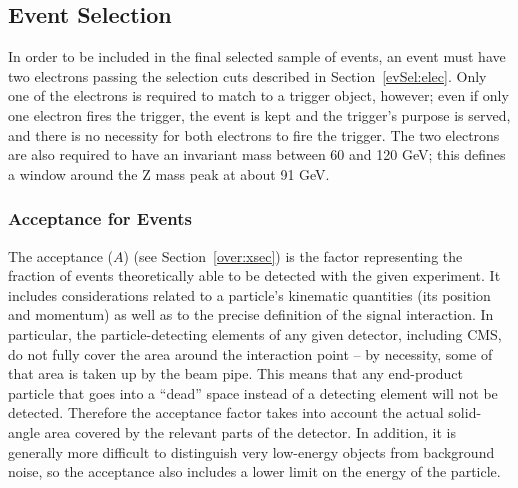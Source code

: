 \subsection{\Zee Event Selection}
\label{evSel:zee}

In order to be included in the final selected sample of \Zee events, 
an event must have two electrons passing the selection cuts 
described in Section~\ref{evSel:elec}.  
Only one of the electrons is required to match to a trigger object, however; 
even if only one electron fires the trigger, 
the event is kept and the trigger's purpose is served, 
and there is no 
necessity for both electrons to fire the trigger.  
The two electrons are also required to have an invariant mass 
between 60 and 120 GeV; 
this defines a window around the Z mass peak at about 91 GeV.  

\subsubsection{Acceptance for \Zee Events}  %
\label{evSel:acc}


The acceptance %
($A$) %
(see Section~\ref{over:xsec}) 
is the factor representing the fraction of events 
theoretically able to be detected with the given experiment.  
It includes considerations related to a particle's kinematic quantities 
(its position and momentum)
as well as to the precise definition of the signal interaction.  
In particular, the particle-detecting elements of any given 
detector, including CMS, do not fully cover the area around 
the interaction point -- 
by necessity, some of that area is taken up by the beam pipe.  
This means that any end-product particle that goes into a 
``dead'' space instead of a detecting element will not be 
detected.  
Therefore the acceptance factor takes into account the 
actual solid-angle area covered by the relevant parts of the detector.  
In addition, it is generally more difficult to distinguish 
very low-energy objects from background noise, 
so the acceptance also includes a lower limit on the 
energy of the particle.  

